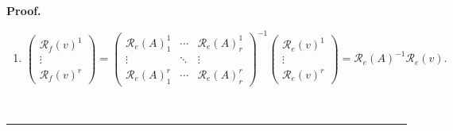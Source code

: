 \documentclass[aps,preprint]{revtex4}
\newenvironment{proof}[1][Proof]{\noindent\textbf{#1.} }{\ \rule{0.5em}{0.5em}}
\begin{document}
\begin{proof}
\begin{enumerate}
\begin{gather}
\left( 
\begin{array}{c}
\mathcal{R}_{f_{b}}\left( h_{d}\right) _{1} \\ 
\vdots \\ 
\mathcal{R}_{f_{b}}\left( h_{d}\right) _{r}%
\end{array}%
\right) =\left( 
\begin{array}{ccc}
\mathcal{R}_{e}\left( A\right) _{1}^{1} & \cdots & \mathcal{R}_{e}\left(
A\right) _{r}^{1} \\ 
\vdots & \ddots & \vdots \\ 
\mathcal{R}_{e}\left( A\right) _{1}^{r} & \cdots & \mathcal{R}_{e}\left(
A\right) _{r}^{r}%
\end{array}%
\right) \left( 
\begin{array}{c}
\mathcal{R}_{e_{b}}\left( h_{d}\right) _{1} \\ 
\vdots \\ 
\mathcal{R}_{e_{b}}\left( h_{d}\right) _{r}%
\end{array}%
\right) \\
\parallel \\
\left( 
\begin{array}{c}
\mathcal{R}_{f_{b}}\left( h_{d}\right) _{1} \\ 
\vdots \\ 
\mathcal{R}_{f_{b}}\left( h_{d}\right) _{r}%
\end{array}%
\right) =\mathcal{R}_{e}\left( A\right) \mathcal{R}_{e_{b}}\left(
h_{d}\right)
\end{gather}%
and the coordinates of vectors $v$ transform as

\item 
\begin{equation}
\left( 
\begin{array}{c}
\mathcal{R}_{f}\left( v\right) ^{1} \\ 
\vdots \\ 
\mathcal{R}_{f}\left( v\right) ^{r}%
\end{array}%
\right) =\left( 
\begin{array}{ccc}
\mathcal{R}_{e}\left( A\right) _{1}^{1} & \cdots & \mathcal{R}_{e}\left(
A\right) _{r}^{1} \\ 
\vdots & \ddots & \vdots \\ 
\mathcal{R}_{e}\left( A\right) _{1}^{r} & \cdots & \mathcal{R}_{e}\left(
A\right) _{r}^{r}%
\end{array}%
\right) ^{-1}\left( 
\begin{array}{c}
\mathcal{R}_{e}\left( v\right) ^{1} \\ 
\vdots \\ 
\mathcal{R}_{e}\left( v\right) ^{r}%
\end{array}%
\right) =\mathcal{R}_{e}\left( A\right) ^{-1}\mathcal{R}_{e}\left( v\right) .
\end{equation}


\end{enumerate}
\end{proof}
\end{document}
